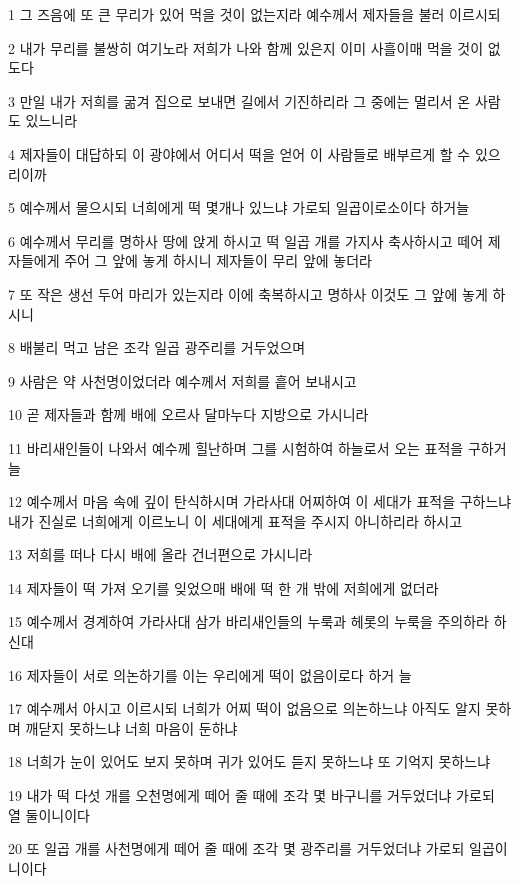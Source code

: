 \par 1 그 즈음에 또 큰 무리가 있어 먹을 것이 없는지라 예수께서 제자들을 불러 이르시되
\par 2 내가 무리를 불쌍히 여기노라 저희가 나와 함께 있은지 이미 사흘이매 먹을 것이 없도다
\par 3 만일 내가 저희를 굶겨 집으로 보내면 길에서 기진하리라 그 중에는 멀리서 온 사람도 있느니라
\par 4 제자들이 대답하되 이 광야에서 어디서 떡을 얻어 이 사람들로 배부르게 할 수 있으리이까
\par 5 예수께서 물으시되 너희에게 떡 몇개나 있느냐 가로되 일곱이로소이다 하거늘
\par 6 예수께서 무리를 명하사 땅에 앉게 하시고 떡 일곱 개를 가지사 축사하시고 떼어 제자들에게 주어 그 앞에 놓게 하시니 제자들이 무리 앞에 놓더라
\par 7 또 작은 생선 두어 마리가 있는지라 이에 축복하시고 명하사 이것도 그 앞에 놓게 하시니
\par 8 배불리 먹고 남은 조각 일곱 광주리를 거두었으며
\par 9 사람은 약 사천명이었더라 예수께서 저희를 흩어 보내시고
\par 10 곧 제자들과 함께 배에 오르사 달마누다 지방으로 가시니라
\par 11 바리새인들이 나와서 예수께 힐난하며 그를 시험하여 하늘로서 오는 표적을 구하거늘
\par 12 예수께서 마음 속에 깊이 탄식하시며 가라사대 어찌하여 이 세대가 표적을 구하느냐 내가 진실로 너희에게 이르노니 이 세대에게 표적을 주시지 아니하리라 하시고
\par 13 저희를 떠나 다시 배에 올라 건너편으로 가시니라
\par 14 제자들이 떡 가져 오기를 잊었으매 배에 떡 한 개 밖에 저희에게 없더라
\par 15 예수께서 경계하여 가라사대 삼가 바리새인들의 누룩과 헤롯의 누룩을 주의하라 하신대
\par 16 제자들이 서로 의논하기를 이는 우리에게 떡이 없음이로다 하거 늘
\par 17 예수께서 아시고 이르시되 너희가 어찌 떡이 없음으로 의논하느냐 아직도 알지 못하며 깨닫지 못하느냐 너희 마음이 둔하냐
\par 18 너희가 눈이 있어도 보지 못하며 귀가 있어도 듣지 못하느냐 또 기억지 못하느냐
\par 19 내가 떡 다섯 개를 오천명에게 떼어 줄 때에 조각 몇 바구니를 거두었더냐 가로되 열 둘이니이다
\par 20 또 일곱 개를 사천명에게 떼어 줄 때에 조각 몇 광주리를 거두었더냐 가로되 일곱이니이다
